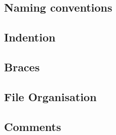 
\subsection{Naming conventions}
\subsection{Indention}
\subsection{Braces}
\subsection{File Organisation}
\subsection{Comments}





